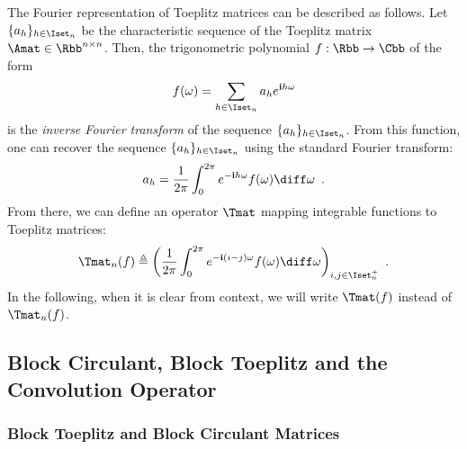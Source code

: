 The Fourier representation of Toeplitz matrices can be described as follows.
Let $\{a_h\}_{h \in \Iset_n}$ be the characteristic sequence of the Toeplitz matrix $\Amat \in \Rbb^{n\times n}$.
Then, the trigonometric polynomial $f: \Rbb \rightarrow \Cbb$ of the form
\begin{equation}
  f(\omega) = \sum_{h \in \Iset_n} a_h e^{\ci h \omega}
\end{equation}
is the \emph{inverse Fourier transform} of the sequence $\{a_h\}_{h \in \Iset_n}$.
From this function, one can recover the sequence $\{a_h\}_{h \in \Iset_n}$ using the standard Fourier transform:
\begin{equation}
  a_h = \frac{1}{2\pi} \int_0^{2\pi} e^{-\ci h \omega} f(\omega) \diff \omega \enspace.
\end{equation}
\noindent
From there, we can define an operator $\Tmat$ mapping integrable functions to Toeplitz matrices:
\begin{equation} \label{equation:ch2-toeplitz_operator}
  \Tmat_n(f) \triangleq \leftmat\frac{1}{2\pi} \int_{0}^{2\pi} e^{-\ci(i-j)\omega}f(\omega) \diff \omega \rightmat_{i,j \in \Iset^+_n} \enspace.
\end{equation}
In the following, when it is clear from context, we will write $\Tmat(f)$ instead of $\Tmat_n(f)$.





\subsection{Block Circulant, Block Toeplitz and the Convolution Operator}
\label{subsection:ch2-block_toeplitz_and_block_circulant_matrices}

\subsubsection{Block Toeplitz and Block Circulant Matrices}
\label{subsubsection:ch2-block_circulant_and_block_toeplitz_matrices}

